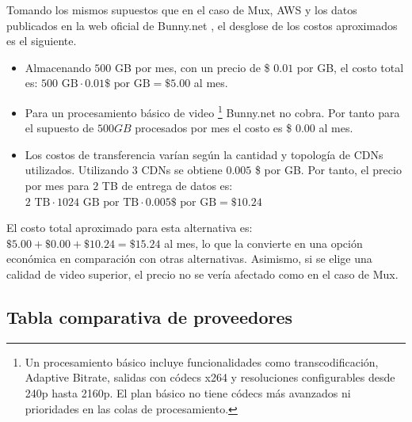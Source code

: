 Tomando los mismos supuestos que en el caso de Mux, AWS y los datos publicados en la web oficial de Bunny.net \cite{bunny-pricing}, el desglose de los costos aproximados es el siguiente.

\begin{itemize}
    \item Almacenando $500$ GB por mes, con un precio de \$ $0.01$ por GB, el costo total es: $500 \text{ GB} \cdot 0.01 \$ \text{ por GB} = \$5.00$ al mes.
    \item Para un procesamiento básico de video \footnote{Un procesamiento básico incluye funcionalidades como transcodificación, Adaptive Bitrate, salidas con códecs x264 y resoluciones configurables desde 240p hasta 2160p. El plan básico no tiene códecs más avanzados ni prioridades en las colas de procesamiento. } Bunny.net no cobra. Por tanto para el supuesto de $500 GB$ procesados por mes el costo es \$ $0.00$ al mes.
    \item Los costos de transferencia varían según la cantidad y topología de CDNs utilizados. Utilizando 3 CDNs se obtiene $0.005$ \$ por GB. Por tanto, el precio por mes para $2$ TB de entrega de datos es: $2 \text{ TB} \cdot 1024 \text{ GB por TB} \cdot 0.005 \$ \text{ por GB} = \$10.24$
\end{itemize}

El costo total aproximado para esta alternativa es: $\$5.00 + \$0.00 + \$10.24 = \$15.24$ al mes, lo que la convierte en una opción económica en comparación con otras alternativas. Asimismo, si se elige una calidad de video superior, el precio no se vería afectado como en el caso de Mux.     

\pagebreak

\subsection{Tabla comparativa de proveedores}

